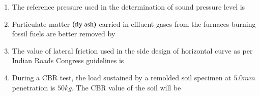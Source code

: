 \documentclass[journal,12pt,onecolumn]{IEEEtran}
\theoremstyle{remark}
\begin{document}
\begin{enumerate}
\item The reference pressure used in the determination of sound pressure level is

\hfill{}
\begin{enumerate}
\end{enumerate}

\item Particulate matter $\left(\text{fly ash}\right)$ carried in effluent gases from the furnaces burning fossil fuels are better removed by

\hfill{}
\begin{enumerate}
\end{enumerate}

\item The value of lateral friction used in the side design of horizontal curve as per Indian Roads Congress guidelines is

\hfill{}
\begin{enumerate}
\end{enumerate}

\item During a CBR test, the load sustained by a remolded soil specimen at $5.0mm$ penetration is $50kg$. The CBR value of the soil will be

\hfill{}
\begin{enumerate}
\end{enumerate}


\end{enumerate}
\end{document}
